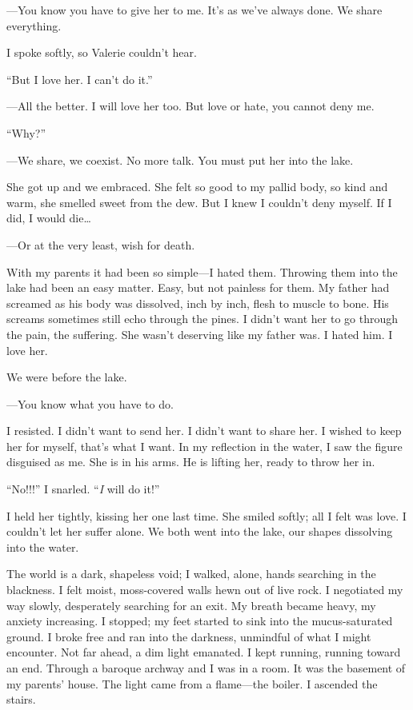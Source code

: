 ---You know you have to give her to me. It's as we've always done. We
share everything.

I spoke softly, so Valerie couldn't hear.

``But I love her. I can't do it.''

---All the better. I will love her too. But love or hate, you cannot
deny me.

``Why?''

---We share, we coexist. No more talk. You must put her into the lake.

She got up and we embraced. She felt so good to my pallid body, so kind
and warm, she smelled sweet from the dew. But I knew I couldn't deny
myself. If I did, I would die\ldots{}

---Or at the very least, wish for death.

With my parents it had been so simple---I hated them. Throwing them into
the lake had been an easy matter. Easy, but not painless for them. My
father had screamed as his body was dissolved, inch by inch, flesh to
muscle to bone. His screams sometimes still echo through the pines. I
didn't want her to go through the pain, the suffering. She wasn't
deserving like my father was. I hated him. I love her.

We were before the lake.

---You know what you have to do.

I resisted. I didn't want to send her. I didn't want to share her. I
wished to keep her for myself, that's what I want. In my reflection in
the water, I saw the figure disguised as me. She is in his arms. He is
lifting her, ready to throw her in.

``No!!!'' I snarled. ``\emph{I} will do it!''

I held her tightly, kissing her one last time. She smiled softly; all I
felt was love. I couldn't let her suffer alone. We both went into the
lake, our shapes dissolving into the water.

The world is a dark, shapeless void; I walked, alone, hands searching in
the blackness. I felt moist, moss-covered walls hewn out of live rock. I
negotiated my way slowly, desperately searching for an exit. My breath
became heavy, my anxiety increasing. I stopped; my feet started to sink
into the mucus-saturated ground. I broke free and ran into the darkness,
unmindful of what I might encounter. Not far ahead, a dim light
emanated. I kept running, running toward an end. Through a baroque
archway and I was in a room. It was the basement of my parents' house.
The light came from a flame---the boiler. I ascended the stairs.

